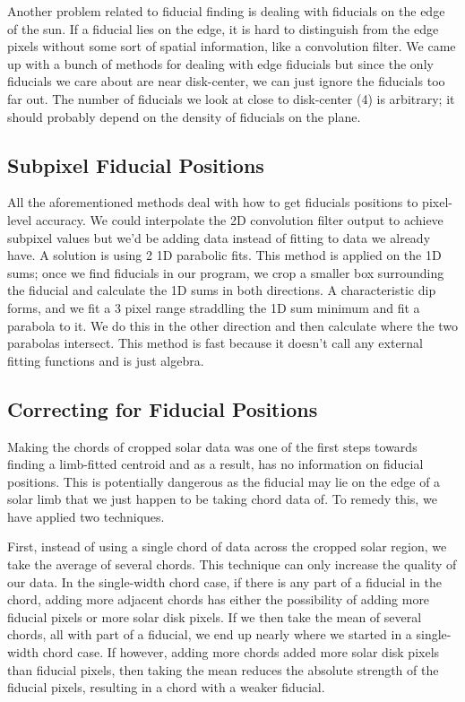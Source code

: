 \documentclass[10pt]{scrartcl}
\begin{document}
Another problem related to fiducial finding is dealing with fiducials on the edge of the sun. If a fiducial lies on the edge, it is hard to distinguish from the edge pixels without some sort of spatial information, like a convolution filter. We came up with a bunch of methods for dealing with edge fiducials but since the only fiducials we care about are near disk-center, we can just ignore the fiducials too far out. The number of fiducials we look at close to disk-center (4) is arbitrary; it should probably depend on the density of fiducials on the plane. 

\subsection{Subpixel Fiducial Positions} %
\label{sub:subpixel_fiducial_positions}
All the aforementioned methods deal with how to get fiducials positions to pixel-level accuracy. We could interpolate the 2D convolution filter output to achieve subpixel values but we'd be adding data instead of fitting to data we already have. A solution is using 2 1D parabolic fits. This method is applied on the 1D sums; once we find fiducials in our program, we crop a smaller box surrounding the fiducial and calculate the 1D sums in both directions. A characteristic dip forms, and we fit a 3 pixel range straddling the 1D sum minimum and fit a parabola to it. We do this in the other direction and then calculate where the two parabolas intersect. This method is fast because it doesn't call any external fitting functions and is just algebra.  

\subsection{Correcting for Fiducial Positions} %
\label{sub:correcting_for_fiducial_positions}
Making the chords of cropped solar data was one of the first steps towards finding a limb-fitted centroid and as a result, has no information on fiducial positions. This is potentially dangerous as the fiducial may lie on the edge of a solar limb that we just happen to be taking chord data of. To remedy this, we have applied two techniques. 

First, instead of using a single chord of data across the cropped solar region, we take the average of several chords. This technique can only increase the quality of our data. In the single-width chord case, if there is any part of a fiducial in the chord, adding more adjacent chords has either the possibility of adding more fiducial pixels or more solar disk pixels. If we then take the mean of several chords, all with part of a fiducial, we end up nearly where we started in a single-width chord case. If however, adding more chords added more solar disk pixels than fiducial pixels, then taking the mean reduces the absolute strength of the fiducial pixels, resulting in a chord with a weaker fiducial. 
\end{document}
